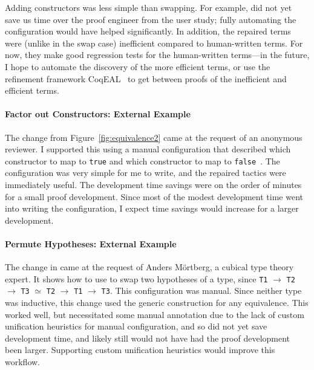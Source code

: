 Adding constructors was less simple than swapping.
For example, \toolnamec did not yet save us time over the proof engineer from the user study;
fully automating the configuration would have helped significantly.
In addition, the repaired terms were (unlike in the swap case) inefficient compared to human-written terms.
For now, they make good regression tests for the human-written terms---in the future,
I hope to automate the discovery of the more efficient terms,
or use the refinement framework CoqEAL~\cite{cohen:hal-01113453}
to get between proofs of the inefficient and efficient terms.

\paragraph{Factor out Constructors: External Example}
The change from Figure~\ref{fig:equivalence2} came at the request of an anonymous reviewer.
I supported this using a manual configuration that described which constructor to map to \lstinline{true}
and which constructor to map to \lstinline{false}~\href{https://github.com/uwplse/pumpkin-pi/blob/v2.0.0/plugin/coq/playground/constr_refactor.v}{}.
The configuration was very simple for me to write, and the repaired tactics were immediately useful.
The development time savings were on the order of minutes for a small proof development.
Since most of the modest development time went into writing the configuration,
I expect time savings would increase for a larger development.

\paragraph{Permute Hypotheses: External Example}
The change in \href{https://github.com/uwplse/pumpkin-pi/blob/v2.0.0/plugin/coq/playground/flip.v}{} came at the request of Anders M\"{o}rtberg,
a cubical type theory expert. %
It shows how to use \toolnamec to swap two hypotheses of a type, since \lstinline{T1} $\rightarrow$ \lstinline{T2} $\rightarrow$ \lstinline{T3} $\simeq$
\lstinline{T2} $\rightarrow$ \lstinline{T1} $\rightarrow$ \lstinline{T3}.
This configuration was manual.
Since neither type was inductive, this change used the generic construction for any equivalence.
This worked well, but necessitated some manual annotation due to the lack of custom unification heuristics for 
manual configuration, and so did not yet save development time, and likely still would not have had the proof development been larger.
Supporting custom unification heuristics would improve this workflow.

